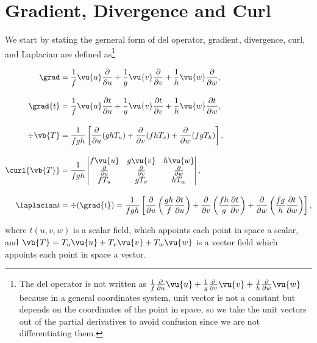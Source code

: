 \documentclass[english,a4paper,12pt]{report}
\begin{document}
\section{Gradient, Divergence and Curl} 

We start by stating the gerneral form of del operator, gradient, divergence, curl, and Laplacian are defined as\footnote{The del operator is not written as \(\frac{1}{f} \frac{\partial}{\partial u}\vu{u}  + \frac{1}{g} \frac{\partial}{\partial v}\vu{v} + \frac{1}{h} \frac{\partial}{\partial w}\vu{w}\) because in a general coordinates system, unit vector is not a constant but depends on the coordinates of the point in space, so we take the unit vectors out of the partial derivatives to avoid confusion since we are not differentiating them.}

\begin{equation} \label{all} 
\begin{aligned}
\grad &= \frac{1}{f}\vu{u}\frac{\partial}{\partial u} + \frac{1}{g}\vu{v}\frac{\partial}{\partial v} + \frac{1}{h}\vu{w}\frac{\partial}{\partial w}, \\[10pt]
\grad{t }&= \frac{1}{f} \vu{u} \frac{\partial t}{\partial u} 
+ \frac{1}{g} \vu{v}\frac{\partial t}{\partial v}  
+ \frac{1}{h} \vu{w}\frac{\partial t}{\partial w} , \\[10pt]
\div{\vb{T}}  &= \frac{1}{fgh} \left[ 
\frac{\partial}{\partial u} (ghT_{u} ) + 
\frac{\partial}{\partial v} (fhT_{v} )+ 
\frac{\partial}{\partial w} (fgT_{h} ) \right], \\[10pt]
\curl{\vb{T} }  &= \frac{1}{fgh} 
\begin{vmatrix} 
f \vu{u} & g \vu{v} & h \vu{w} \\ 
\frac{\partial}{\partial u} & \frac{\partial}{\partial v} & \frac{\partial}{\partial w} \\ 
fT_{u}  & g T_{v}  & h T_{w}  
\end{vmatrix}, \\[10pt]
\laplacian t &= \div{(\grad{t} )} = \displaystyle \frac{1}{fgh} \left[
\frac{\partial}{\partial u} \left( \frac{gh}{f} \frac{\partial t}{\partial u} \right) + 
\frac{\partial}{\partial v} \left( \frac{fh}{g} \frac{\partial t}{\partial v} \right) + 
\frac{\partial}{\partial w} \left( \frac{fg}{h} \frac{\partial t}{\partial w} \right)
\right],
\end{aligned}
\end{equation}

where \(t (u,v,w)\) is a scalar field, which appoints each point in space a scalar, and \(\vb{T} = T_{u}\vu{u} + T_{v}\vu{v} + T_{w}\vu{w} \) is a vector field which appoints each point in space a vector.  
\end{document}
